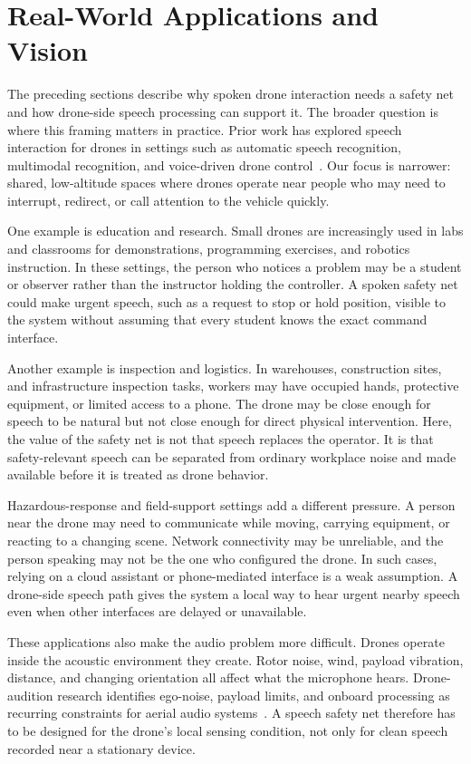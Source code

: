 \section{Real-World Applications and Vision}

The preceding sections describe why spoken drone interaction needs a safety net and how drone-side speech processing can support it. The broader question is where this framing matters in practice. Prior work has explored speech interaction for drones in settings such as automatic speech recognition, multimodal recognition, and voice-driven drone control~\cite{oneata19_interspeech,oneata2021multimodal,park2023uavvehicle}. Our focus is narrower: shared, low-altitude spaces where drones operate near people who may need to interrupt, redirect, or call attention to the vehicle quickly.

One example is education and research. Small drones are increasingly used in labs and classrooms for demonstrations, programming exercises, and robotics instruction. In these settings, the person who notices a problem may be a student or observer rather than the instructor holding the controller. A spoken safety net could make urgent speech, such as a request to stop or hold position, visible to the system without assuming that every student knows the exact command interface.

Another example is inspection and logistics. In warehouses, construction sites, and infrastructure inspection tasks, workers may have occupied hands, protective equipment, or limited access to a phone. The drone may be close enough for speech to be natural but not close enough for direct physical intervention. Here, the value of the safety net is not that speech replaces the operator. It is that safety-relevant speech can be separated from ordinary workplace noise and made available before it is treated as drone behavior.

Hazardous-response and field-support settings add a different pressure. A person near the drone may need to communicate while moving, carrying equipment, or reacting to a changing scene. Network connectivity may be unreliable, and the person speaking may not be the one who configured the drone. In such cases, relying on a cloud assistant or phone-mediated interface is a weak assumption. A drone-side speech path gives the system a local way to hear urgent nearby speech even when other interfaces are delayed or unavailable.

These applications also make the audio problem more difficult. Drones operate inside the acoustic environment they create. Rotor noise, wind, payload vibration, distance, and changing orientation all affect what the microphone hears. Drone-audition research identifies ego-noise, payload limits, and onboard processing as recurring constraints for aerial audio systems~\cite{chevtchenko2025drone_ssl}. A speech safety net therefore has to be designed for the drone's local sensing condition, not only for clean speech recorded near a stationary device.

